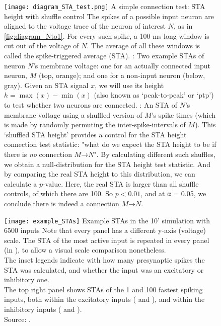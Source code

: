 \begin{figure}
    \hspace*{12em}
    \texttt{[image: diagram\_STA\_test.png]}
    \captionn
        {A simple connection test: STA height with shuffle control}
        {The spikes of a possible input neuron are aligned to the voltage trace of the neuron of interest $N$, as in \cref{fig:diagram_Nto1}. For every such spike, a 100-ms long window is cut out of the voltage of $N$. The average of all these windows is called the spike-triggered average (STA).\newline
        \Left: Two example STAs of neuron $N$'s membrane voltage: one for an actually connected input neuron, $M$ (top, orange); and one for a non-input neuron (below, gray).
        Given an STA signal $x$, we will use its height $h = \max(x) - \min(x)$ (also known as `peak-to-peak' or `ptp') to test whether two neurons are connected. \newline
        \Right: An STA of $N$'s membrane voltage using a shuffled version of $M$'s spike times (which is made by randomly permuting the inter-spike-intervals of $M$). This `shuffled STA height' provides a control for the STA height connection test statistic: "what do we expect the STA height to be if there is \emph{no} connection $M$→$N$".
        By calculating different such shuffles, we obtain a null-distribution for the STA height test statistic. And by comparing the real STA height to this distribution, we can calculate a $p$-value. Here, the real STA is larger than all shuffle controls, of which there are 100. So $p < 0.01$, and at α = 0.05, we conclude there is indeed a connection $M$→$N$.}
    \label{fig:STA-height-suffle}
\end{figure}

\begin{figure}
    \hspace*{12em}
    \texttt{[image: example\_STAs]}
    \vspace*{1em}
    \captionn
        {Example STAs in the 10' simulation with 6500 inputs}
        {
        Note that every panel has a different y-axis (voltage) scale. The STA of the most active input is repeated in every panel (in ), to allow a visual scale comparison nonetheless.\\
        The inset legends indicate with how many presynaptic spikes the STA was calculated, and whether the input was an excitatory or inhibitory one.\\
        The top right panel shows STAs of the 1 and 100 fastest spiking inputs, both within the excitatory inputs ( and ), and within the inhibitory inputs ( and ).\\
        Source: .}
\end{figure}



